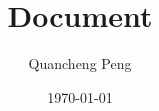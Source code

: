 \documentclass{book}
\begin{document}
\frontmatter
\title{Document}
\author{Quancheng Peng}
\date{\today}
\maketitle

\tableofcontents

\mainmatter







\backmatter
% 
%  
\end{document}
